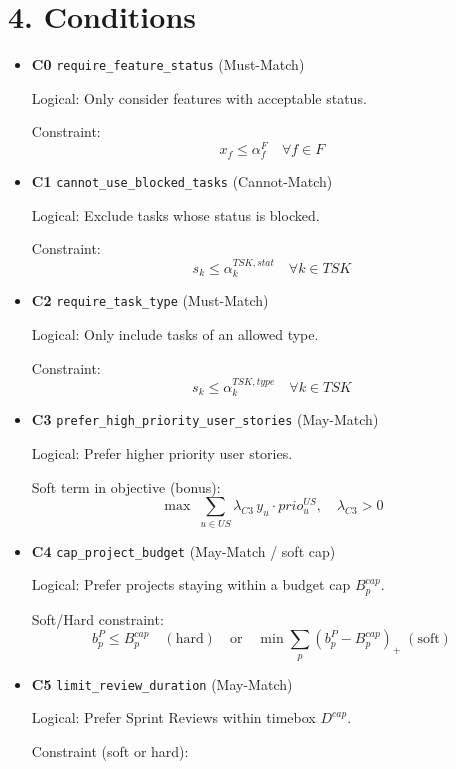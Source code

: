 \documentclass[11pt,a4paper]{article}
\begin{document}
\section{4. Conditions}
\begin{itemize}[leftmargin=2em]
  \item \textbf{C0} \texttt{require\_feature\_status} (Must-Match)\par
        Logical: Only consider features with acceptable status.\par
        Constraint:
        \[
          x_f \le \alpha^F_f \quad \forall f\in F
        \]
  \item \textbf{C1} \texttt{cannot\_use\_blocked\_tasks} (Cannot-Match)\par
        Logical: Exclude tasks whose status is blocked.\par
        Constraint:
        \[
          s_k \le \alpha^{TSK,stat}_k \quad \forall k\in TSK
        \]
  \item \textbf{C2} \texttt{require\_task\_type} (Must-Match)\par
        Logical: Only include tasks of an allowed type.\par
        Constraint:
        \[
          s_k \le \alpha^{TSK,type}_k \quad \forall k\in TSK
        \]
  \item \textbf{C3} \texttt{prefer\_high\_priority\_user\_stories} (May-Match)\par
        Logical: Prefer higher priority user stories.\par
        Soft term in objective (bonus):
        \[
          \max \; \sum_{u\in US} \lambda_{C3}\, y_u \cdot prio^{US}_{u},\quad \lambda_{C3}>0
        \]
  \item \textbf{C4} \texttt{cap\_project\_budget} (May-Match / soft cap)\par
        Logical: Prefer projects staying within a budget cap $B^{cap}_p$.\par
        Soft/Hard constraint:
        \[
          b^{P}_p \le B^{cap}_p \quad (\text{hard}) \quad\text{or}\quad \min \sum_{p}(b^{P}_p - B^{cap}_p)_{+} \; (\text{soft})
        \]
  \item \textbf{C5} \texttt{limit\_review\_duration} (May-Match)\par
        Logical: Prefer Sprint Reviews within timebox $D^{cap}$.\par
        Constraint (soft or hard):

\end{itemize}
\end{document}
